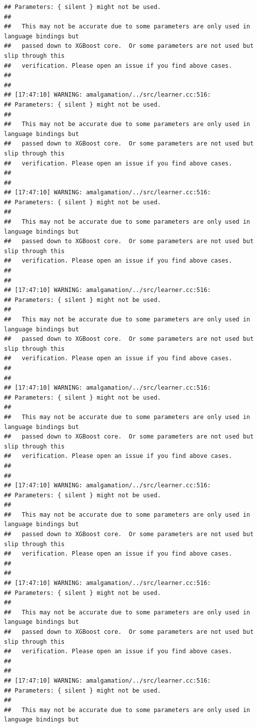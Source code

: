\documentclass[AMS,STIX2COL]{WileyNJD-v2}\usepackage[]{graphicx}\usepackage[]{color}
\makeatletter
\newenvironment{kframe}{%
 \def\at@end@of@kframe{}%
 \ifinner\ifhmode%
  \def\at@end@of@kframe{\end{minipage}}%
  \begin{minipage}{\columnwidth}%
 \fi\fi%
 \def\FrameCommand##1{\hskip\@totalleftmargin \hskip-\fboxsep
 \colorbox{shadecolor}{##1}\hskip-\fboxsep
     \hskip-\linewidth \hskip-\@totalleftmargin \hskip\columnwidth}%
 \MakeFramed {\advance\hsize-\width
   \@totalleftmargin\z@ \linewidth\hsize
   \@setminipage}}%
 {\par\unskip\endMakeFramed%
 \at@end@of@kframe}
\newenvironment{knitrout}{}{} %
\makeatother
\begin{document}
\begin{knitrout}
\begin{kframe}
\begin{verbatim}
## Parameters: { silent } might not be used.
## 
##   This may not be accurate due to some parameters are only used in language bindings but
##   passed down to XGBoost core.  Or some parameters are not used but slip through this
##   verification. Please open an issue if you find above cases.
## 
## 
## [17:47:10] WARNING: amalgamation/../src/learner.cc:516: 
## Parameters: { silent } might not be used.
## 
##   This may not be accurate due to some parameters are only used in language bindings but
##   passed down to XGBoost core.  Or some parameters are not used but slip through this
##   verification. Please open an issue if you find above cases.
## 
## 
## [17:47:10] WARNING: amalgamation/../src/learner.cc:516: 
## Parameters: { silent } might not be used.
## 
##   This may not be accurate due to some parameters are only used in language bindings but
##   passed down to XGBoost core.  Or some parameters are not used but slip through this
##   verification. Please open an issue if you find above cases.
## 
## 
## [17:47:10] WARNING: amalgamation/../src/learner.cc:516: 
## Parameters: { silent } might not be used.
## 
##   This may not be accurate due to some parameters are only used in language bindings but
##   passed down to XGBoost core.  Or some parameters are not used but slip through this
##   verification. Please open an issue if you find above cases.
## 
## 
## [17:47:10] WARNING: amalgamation/../src/learner.cc:516: 
## Parameters: { silent } might not be used.
## 
##   This may not be accurate due to some parameters are only used in language bindings but
##   passed down to XGBoost core.  Or some parameters are not used but slip through this
##   verification. Please open an issue if you find above cases.
## 
## 
## [17:47:10] WARNING: amalgamation/../src/learner.cc:516: 
## Parameters: { silent } might not be used.
## 
##   This may not be accurate due to some parameters are only used in language bindings but
##   passed down to XGBoost core.  Or some parameters are not used but slip through this
##   verification. Please open an issue if you find above cases.
## 
## 
## [17:47:10] WARNING: amalgamation/../src/learner.cc:516: 
## Parameters: { silent } might not be used.
## 
##   This may not be accurate due to some parameters are only used in language bindings but
##   passed down to XGBoost core.  Or some parameters are not used but slip through this
##   verification. Please open an issue if you find above cases.
## 
## 
## [17:47:10] WARNING: amalgamation/../src/learner.cc:516: 
## Parameters: { silent } might not be used.
## 
##   This may not be accurate due to some parameters are only used in language bindings but

\end{verbatim}
\end{kframe}
\end{knitrout}
\end{document}
